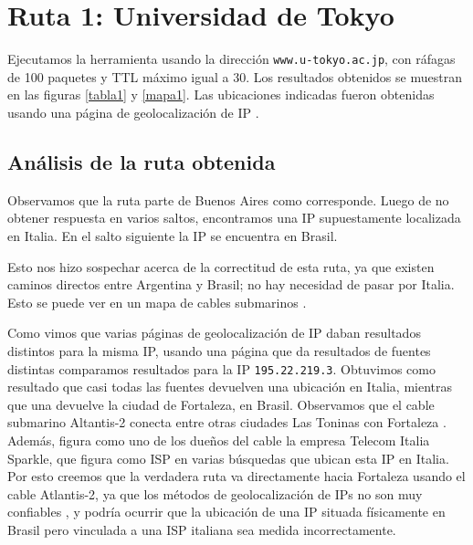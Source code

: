 \section{Ruta 1: Universidad de Tokyo}

Ejecutamos la herramienta usando la dirección \texttt{www.u-tokyo.ac.jp}, con ráfagas de 100 paquetes y TTL máximo igual a 30. Los resultados obtenidos se muestran en las figuras \ref{tabla1} y \ref{mapa1}. Las ubicaciones indicadas fueron obtenidas usando una página de geolocalización de IP \cite{ip2location}.

\subsection{Análisis de la ruta obtenida}
Observamos que la ruta parte de Buenos Aires como corresponde. Luego de no obtener respuesta en varios saltos, encontramos una IP supuestamente localizada en Italia. En el salto siguiente la IP se encuentra en Brasil.

Esto nos hizo sospechar acerca de la correctitud de esta ruta, ya que existen caminos directos entre Argentina y Brasil; no hay necesidad de pasar por Italia. Esto se puede ver en un mapa de cables submarinos \cite{cables}.

Como vimos que varias páginas de geolocalización de IP daban resultados distintos para la misma IP, usando una página que da resultados de fuentes distintas \cite{iplocation} comparamos resultados para la IP \texttt{195.22.219.3}. Obtuvimos como resultado que casi todas las fuentes devuelven una ubicación en Italia, mientras que una devuelve la ciudad de Fortaleza, en Brasil. Observamos que el cable submarino Altantis-2 conecta entre otras ciudades Las Toninas con Fortaleza \cite{atlantis2}. Además, figura como uno de los dueños del cable la empresa Telecom Italia Sparkle, que figura como ISP en varias búsquedas que ubican esta IP en Italia. Por esto creemos que la verdadera ruta va directamente hacia Fortaleza usando el cable Atlantis-2, ya que los métodos de geolocalización de IPs no son muy confiables \cite{accuracy}, y podría ocurrir que la ubicación de una IP situada físicamente en Brasil pero vinculada a una ISP italiana sea medida incorrectamente.



